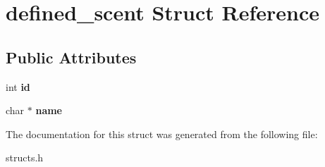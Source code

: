 \hypertarget{structdefined__scent}{\section{defined\-\_\-scent Struct Reference}
\label{structdefined__scent}
}
\subsection*{Public Attributes}
\begin{DoxyCompactItemize}
\item 
\hypertarget{structdefined__scent_a06377aa498a4e08e88780482a5526298}{int {\bfseries id}}\label{structdefined__scent_a06377aa498a4e08e88780482a5526298}

\item 
\hypertarget{structdefined__scent_a519a9186d8f7e23334c40702ad6e3bb0}{char $\ast$ {\bfseries name}}\label{structdefined__scent_a519a9186d8f7e23334c40702ad6e3bb0}

\end{DoxyCompactItemize}


The documentation for this struct was generated from the following file\-:\begin{DoxyCompactItemize}
\item 
structs.\-h\end{DoxyCompactItemize}
